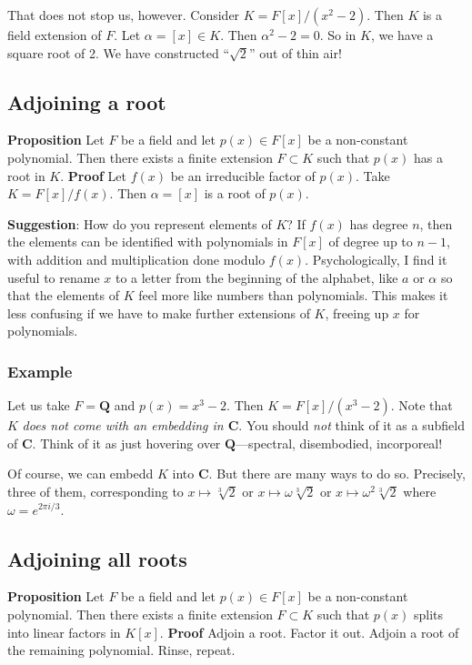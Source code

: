 \documentclass[11pt]{article}
\begin{document}
That does not stop us, however.
Consider \(K = F[x]/(x^2-2)\).
Then \(K\) is a field extension of \(F\).
Let \(\alpha = [x] \in K\).
Then \(\alpha^2 - 2 = 0.\)
So in \(K\), we have a square root of 2.
We have constructed ``\(\sqrt{2}\)'' out of thin air!
\subsection{Adjoining a root}
\label{sec:org37c0b21}
\textbf{\textbf{Proposition}}  Let \(F\) be a field and let \(p(x) \in F[x]\) be a non-constant polynomial.
Then there exists a finite extension \(F \subset K\) such that \(p(x)\) has a root in \(K\).
\textbf{\textbf{Proof}} Let \(f(x)\) be an irreducible factor of \(p(x)\).
Take \(K = F[x]/f(x)\).
Then \(\alpha = [x]\) is a root of \(p(x)\).

\textbf{\textbf{Suggestion}}: How do you represent elements of \(K\)?
If \(f(x)\) has degree \(n\), then the elements can be identified with polynomials in \(F[x]\) of degree up to \(n-1\), with addition and multiplication done modulo \(f(x)\).
Psychologically, I find it useful to rename \(x\) to a letter from the beginning of the alphabet, like \(a\) or \(\alpha\) so that the elements of \(K\) feel more like numbers than polynomials.
This makes it less confusing if we have to make further extensions of \(K\), freeing up \(x\) for polynomials.
\subsubsection{Example}
\label{sec:orgd8ce2ca}
Let us take \(F = \mathbf{Q}\) and \(p(x) = x^3-2\).
Then \(K = F[x]/(x^3-2)\).
Note that \(K\) \emph{does not come with an embedding in \(\mathbf{C}\)}.
You should \emph{not} think of it as a subfield of \(\mathbf{C}\).
Think of it as just hovering over \(\mathbf{Q}\)---spectral, disembodied, incorporeal!

Of course, we can embedd \(K\) into \(\mathbf{C}\).
But there are many ways to do so.
Precisely, three of them, corresponding to \(x \mapsto \sqrt[3]{2}\) or \(x \mapsto \omega\sqrt[3]{2}\) or \(x \mapsto \omega^{2}\sqrt[3]{2}\) where \(\omega = e^{2\pi i/3}\).
\subsection{Adjoining all roots}
\label{sec:orge399137}
\textbf{\textbf{Proposition}} Let \(F\) be a field and let \(p(x) \in F[x]\) be a non-constant polynomial.
Then there exists a finite extension \(F \subset K\) such that \(p(x)\) splits into linear factors in \(K[x]\).
\textbf{\textbf{Proof}} Adjoin a root.  Factor it out. Adjoin a root of the remaining polynomial.  Rinse, repeat.
\end{document}

